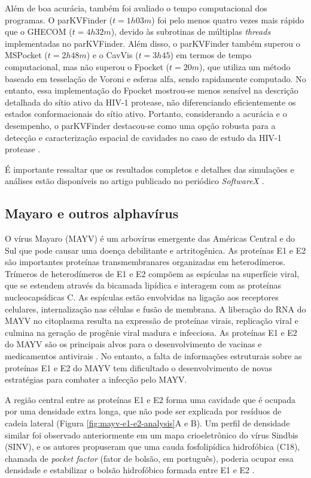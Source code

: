 \documentclass[Portugues]{phdquali}
\begin{document}
Além de boa acurácia, também foi avaliado o tempo computacional dos programas. O parKVFinder ($t = 1h03m$) foi pelo menos quatro vezes mais rápido que o GHECOM ($t = 4h32m$), devido às subrotinas de múltiplas \textit{threads} implementadas no parKVFinder. Além disso, o parKVFinder também superou o MSPocket ($t = 2h48m$) e o CavVis ($t = 3h45$) em termos de tempo computacional, mas não superou o Fpocket ($t = 20m$), que utiliza um método baseado em tesselação de Voroni e esferas alfa, sendo rapidamente computado. No entanto, essa implementação do Fpocket mostrou-se menos sensível na descrição detalhada do sítio ativo da HIV-1 protease, não diferenciando eficientemente os estados conformacionais do sítio ativo. Portanto, considerando a acurácia e o desempenho, o parKVFinder destacou-se como uma opção robusta para a detecção e caracterização espacial de cavidades no caso de estudo da HIV-1 protease \cite{guerra2020}.

É importante ressaltar que os resultados completos e detalhes das simulações e análises estão disponíveis no artigo publicado no periódico \textit{SoftwareX} \cite{guerra2020}.

\subsection{Mayaro e outros alphavírus}

O vírus Mayaro (MAYV) é um arbovírus emergente das Américas Central e do Sul que pode causar uma doença debilitante e artritogênica. As proteínas E1 e E2 são importantes proteínas transmembranares organizadas em heterodímeros. Trímeros de heterodímeros de E1 e E2 compõem as espículas na superfície viral, que se estendem através da bicamada lipídica e interagem com as proteínas nucleocapsídicas C. As espículas estão envolvidas na ligação aos receptores celulares, internalização nas células e fusão de membrana. A liberação do RNA do MAYV no citoplasma resulta na expressão de proteínas virais, replicação viral e culmina na geração de progênie viral madura e infecciosa. As proteínas E1 e E2 do MAYV são os principais alvos para o desenvolvimento de vacinas e medicamentos antivirais \cite{ribeiro2021}. No entanto, a falta de informações estruturais sobre as proteínas E1 e E2 do MAYV tem dificultado o desenvolvimento de novas estratégias para combater a infecção pelo MAYV.

A região central entre as proteínas E1 e E2 forma uma cavidade que é ocupada por uma densidade extra longa, que não pode ser explicada por resíduos de cadeia lateral (Figura \ref{fig:mayv-e1-e2-analysis}A e B). Um perfil de densidade similar foi observado anteriormente em um mapa crioeletrônico do vírus Sindbis (SINV), e os autores propuseram que uma cauda fosfolipídica hidrofóbica (C18), chamada de \textit{pocket factor} (fator de bolsão, em português), poderia ocupar essa densidade e estabilizar o bolsão hidrofóbico formada entre E1 e E2 \cite{chen2018}.
\end{document}
